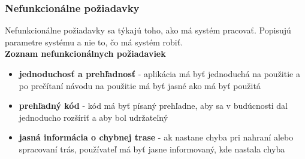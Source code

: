 \subsubsection{Nefunkcionálne požiadavky}
\indent \indent Nefunkcionálne požiadavky sa týkajú toho, ako má systém pracovať. Popisujú parametre systému a nie to, čo má systém robiť.\\
\textbf{Zoznam nefunkcionálnych požiadaviek}
\begin{itemize}
    \item \textbf{jednoduchosť a prehľadnosť} - aplikácia má byť jednoduchá na použitie a po prečítaní návodu na použitie má byť jasné ako má byť použitá
    \item \textbf{prehľadný kód} - kód má byť písaný prehľadne, aby sa v budúcnosti dal jednoducho rozšíriť a aby bol udržateľný
    \item \textbf{jasná informácia o chybnej trase} - ak nastane chyba pri nahraní alebo spracovaní trás, používateľ má byť jasne informovaný, kde nastala chyba
\end{itemize}
